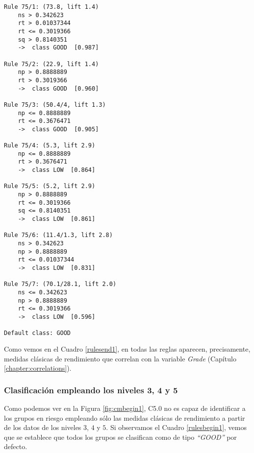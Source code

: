 \begin{tcolorbox}[title=Reglas de clasificación para identificar grupos de tipo \emph{``LOW''}.]
  \makeatletter
  \makeatother
  
 \label{rulesend1}  
  
\begin{multicols}{2}
    \begin{verbatim}
Rule 75/1: (73.8, lift 1.4)
	ns > 0.342623
	rt > 0.01037344
	rt <= 0.3019366
	sq > 0.8140351
	->  class GOOD  [0.987]

Rule 75/2: (22.9, lift 1.4)
	np > 0.8888889
	rt > 0.3019366
	->  class GOOD  [0.960]

Rule 75/3: (50.4/4, lift 1.3)
	np <= 0.8888889
	rt <= 0.3676471
	->  class GOOD  [0.905]

Rule 75/4: (5.3, lift 2.9)
	np <= 0.8888889
	rt > 0.3676471
	->  class LOW  [0.864]

Rule 75/5: (5.2, lift 2.9)
	np > 0.8888889
	rt <= 0.3019366
	sq <= 0.8140351
	->  class LOW  [0.861]

Rule 75/6: (11.4/1.3, lift 2.8)
	ns > 0.342623
	np > 0.8888889
	rt <= 0.01037344
	->  class LOW  [0.831]

Rule 75/7: (70.1/28.1, lift 2.0)
	ns <= 0.342623
	np > 0.8888889
	rt <= 0.3019366
	->  class LOW  [0.596]
	
Default class: GOOD
    \end{verbatim}
  \end{multicols}
\end{tcolorbox}

Como vemos en el Cuadro \ref{rulesend1}, en todas las reglas aparecen, precisamente, medidas clásicas de rendimiento que correlan con la variable \emph{Grade} (Capítulo \ref{chapter:correlations}).

\subsubsection{Clasificación empleando los niveles 3, 4 y 5}

Como podemos ver en la Figura \ref{fig:cmbegin1}, C5.0 no es capaz de identificar a los grupos en riesgo empleando sólo las medidas clásicas de rendimiento a partir de los datos de los niveles $3$, $4$ y $5$. Si observamos el Cuadro \ref{rulesbegin1}, vemos que se establece que todos los grupos se clasifican como de tipo \emph{``GOOD''} por defecto.

